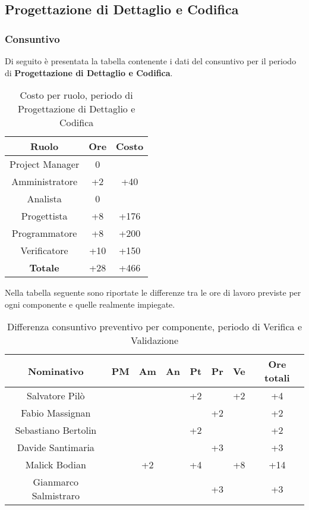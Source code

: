 \subsection{Progettazione di Dettaglio e Codifica}
		\subsubsection{Consuntivo}
		Di seguito è presentata la tabella contenente i dati del consuntivo per il periodo di \textbf{Progettazione di Dettaglio e Codifica}.
	\begin{table}[H]
		\centering
		\begin{tabular}{|c|c|c|}
			\hline
			\textbf{Ruolo}		& \textbf{Ore}	& \textbf{Costo} \\
			\hline
			Project Manager		& 0			&	\\
			Amministratore		& +2		& +40	\\
			Analista			& 0			&  \\
			Progettista			& +8		& +176	\\
			Programmatore		& +8		& +200	\\
			Verificatore		& +10		& +150	\\
			\hline
			\textbf{Totale}		& +28		& +466	\\
			\hline
		\end{tabular}
		\caption{Costo per ruolo, periodo di Progettazione di Dettaglio e Codifica}
	\end{table}
	Nella tabella seguente sono riportate le differenze tra le ore di lavoro previste per ogni componente e quelle realmente impiegate.
	\begin{table}[H]
		\centering
		\begin{tabular}{|c|c|c|c|c|c|c|c|}
			\hline
			\textbf{Nominativo}		& \textbf{PM}	& \textbf{Am}	& \textbf{An}	& \textbf{Pt}	& \textbf{Pr}	& \textbf{Ve}	& \textbf{Ore totali}     \\
			\hline
			Salvatore Pilò			& 		& 		& 		& +2	&		& +2	& +4 \\
			Fabio Massignan			& 		& 		&		&		& +2	& 		& +2 \\
			Sebastiano Bertolin		&		& 	 	& 		& +2	& 		&		& +2 \\
			Davide Santimaria		&		& 		&		&		& +3	& 		& +3 \\
			Malick Bodian			& 		& +2	& 		& +4	&		& +8	& +14 \\
			Gianmarco Salmistraro	&		&		& 	 	&		& +3	& 		& +3 \\
			\hline
		\end{tabular}
		\caption{Differenza consuntivo preventivo per componente, periodo di Verifica e Validazione}
	\end{table}
